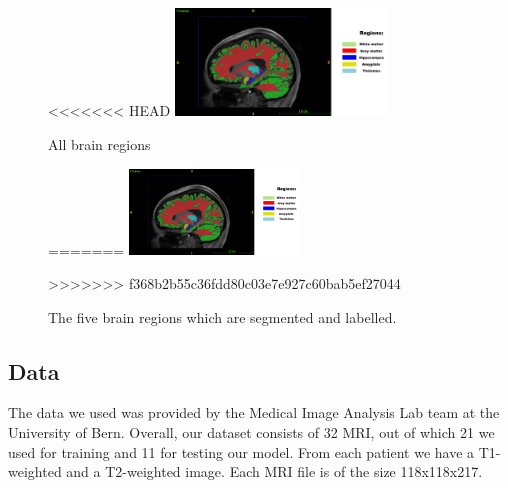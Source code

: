 \documentclass[journal]{IEEEtran}
\begin{document}
	\begin{figure}[h]
		\centering
<<<<<<< HEAD
		\includegraphics[width=0.5\textwidth]{T1native_all_regions_labelled.png}
		\caption{All brain regions}
		\label{fig:figure1}
=======
		\includegraphics[width=0.4\textwidth]{T1native_all_regions_labelled}
		\caption{The five brain regions which are segmented and labelled.}
		\label{fig:e1}
>>>>>>> f368b2b55c36fdd80c03e7e927c60bab5ef27044
	\end{figure}

\subsection{Data}
	The data we used was provided by the Medical Image Analysis Lab team at the University of Bern. Overall, our dataset consists of 32 MRI,
	out of which 21 we used for training and 11 for testing our model. From each patient we have a T1-weighted and a T2-weighted image. Each MRI file
	is of the size 118x118x217.
\end{document}
